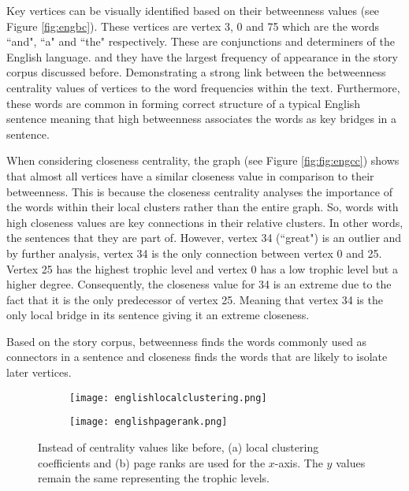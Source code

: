 Key vertices can be visually identified based on their betweenness values (see Figure \ref{fig:engbc}). These vertices are vertex 3, 0 and 75 which are the words ``and", ``a" and ``the" respectively. These are conjunctions and determiners of the English language. and they have the largest frequency of appearance in the story corpus discussed before. Demonstrating a strong link between the betweenness centrality values of vertices to the word frequencies within the text. Furthermore, these words are common in forming correct structure of a typical English sentence meaning that high betweenness associates the words as key bridges in a sentence. 

When considering closeness centrality, the graph (see Figure \ref{fig:fig:engcc}) shows that almost all vertices have a similar closeness value in comparison to their betweenness. This is because the closeness centrality analyses the importance of the words within their local clusters rather than the entire graph. So, words with high closeness values are key connections in their relative clusters. In other words, the sentences that they are part of. However, vertex 34 (``great") is an outlier and by further analysis, vertex 34 is the only connection between vertex 0 and 25. Vertex 25 has the highest trophic level and vertex 0 has a low trophic level but a higher degree. Consequently, the closeness value for 34 is an extreme due to the fact that it is the only predecessor of vertex 25. Meaning that vertex 34 is the only local bridge in its sentence giving it an extreme closeness.

Based on the story corpus, betweenness finds the words commonly used as connectors in a sentence and closeness finds the words that are likely to isolate later vertices.

\begin{figure}[!htb]
\centering
\begin{subfigure}{.45\textwidth}
	\hspace{-1cm} 
	\texttt{[image: englishlocalclustering.png]}
	\caption{}
	\label{fig:englc}
\end{subfigure}
\hfill
\begin{subfigure}{.45\textwidth}
	\hspace{-1cm} 
	\texttt{[image: englishpagerank.png]}
	\caption{}
	\label{fig:engpr}
\end{subfigure}
\caption{Instead of centrality values like before, (a) local clustering coefficients and (b) page ranks are used for the $x$-axis. The $y$ values remain the same representing the trophic levels.}
\end{figure}

